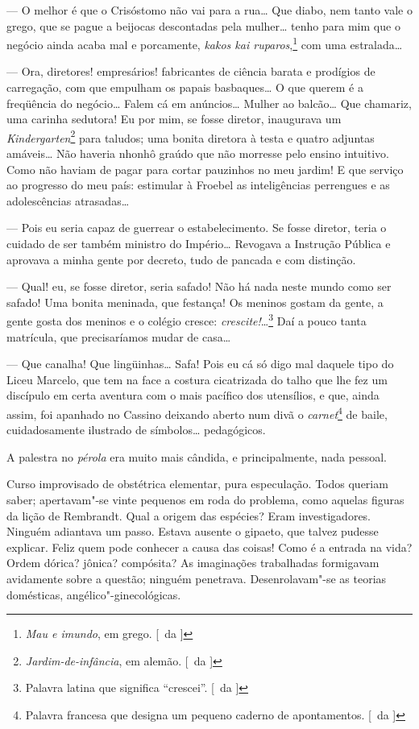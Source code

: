--- O melhor é que o Crisóstomo não vai para a rua\ldots{} Que diabo, nem
tanto vale o grego, que se pague a beijocas descontadas pela mulher\ldots{}
tenho para mim que o negócio ainda acaba mal e porcamente, \textit{kakos kai
ruparos},\footnote{ \textit{Mau e imundo}, em grego. [~da ]} com uma estralada\ldots{} 

--- Ora, diretores! empresários!
fabricantes de ciência barata e prodígios de carregação, com que
empulham os papais basbaques\ldots{} O que querem é a freqüência do
negócio\ldots{} Falem cá em anúncios\ldots{} Mulher ao balcão\ldots{} Que chamariz,
uma carinha sedutora! Eu por mim, se fosse diretor, inaugurava um
\textit{Kindergarten}\footnote{ \textit{Jardim-de-infância}, em alemão. [~da ]} 
para taludos; uma bonita diretora à testa e quatro
adjuntas amáveis\ldots{} Não haveria nhonhô graúdo que não morresse pelo
ensino intuitivo. Como não haviam de pagar para cortar pauzinhos no meu
jardim! E que serviço ao progresso do meu país: estimular à Froebel as
inteligências perrengues e as adolescências atrasadas\ldots{} 

--- Pois eu seria capaz de guerrear o estabelecimento. Se fosse diretor, 
teria o cuidado de ser também ministro do Império\ldots{} Revogava a Instrução
Pública e aprovava a minha gente por decreto, tudo de pancada e com
distinção. 

--- Qual! eu, se fosse diretor, seria safado! Não há nada
neste mundo como ser safado! Uma bonita meninada, que festança! Os
meninos gostam da gente, a gente gosta dos meninos e o colégio cresce:
\textit{crescite!}\ldots{}\footnote{ Palavra latina que significa ``crescei''. 
[~da ]} Daí a pouco tanta matrícula, que precisaríamos mudar de casa\ldots{} 

--- Que canalha! Que lingüinhas\ldots{} Safa! Pois eu cá só digo mal
daquele tipo do Liceu Marcelo, que tem na face a costura cicatrizada do
talho que lhe fez um discípulo em certa aventura com o mais pacífico
dos utensílios, e que, ainda assim, foi apanhado no Cassino deixando
aberto num divã o \textit{carnet}\footnote{ Palavra francesa que designa 
um pequeno caderno de apontamentos. [~da ]} de baile, cuidadosamente ilustrado de
símbolos\ldots{} pedagógicos. 

A palestra no \textit{pérola} era muito mais cândida, e
principalmente, nada pessoal. 

Curso improvisado de obstétrica
elementar, pura especulação. Todos queriam saber; apertavam"-se vinte
pequenos em roda do problema, como aquelas figuras da lição de
Rembrandt. Qual a origem das espécies? Eram investigadores. Ninguém
adiantava um passo. Estava ausente o gipaeto, que talvez pudesse
explicar. Feliz quem pode conhecer a causa das coisas! Como é a entrada
na vida? Ordem dórica? jônica? compósita? As imaginações trabalhadas
formigavam avidamente sobre a questão; ninguém penetrava.
Desenrolavam"-se as teorias domésticas, angélico"-ginecológicas.

